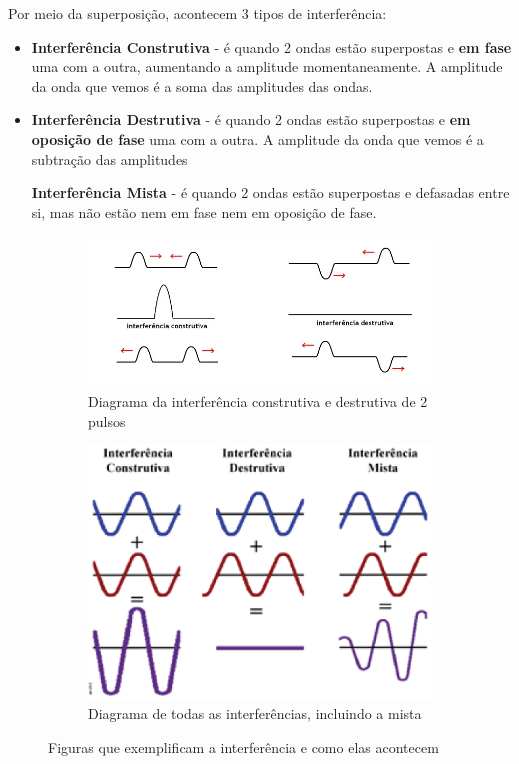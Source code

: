 \documentclass[12pt]{extarticle}
\newcommand{\<}{\langle}
\renewcommand{\>}{\rangle}
\theoremstyle{definition}
\begin{document}
Por meio da superposição, acontecem 3 tipos de interferência:
\begin{itemize}
    \item \textbf{Interferência Construtiva} - é quando 2 ondas estão superpostas e \textbf{em fase} uma com a outra, aumentando a amplitude momentaneamente. A amplitude da onda que vemos é a soma das amplitudes das ondas.
    
    \item \textbf{Interferência Destrutiva} - é quando 2 ondas estão superpostas e \textbf{em oposição de fase} uma com a outra. A amplitude da onda que vemos é a subtração das amplitudes
    
    \textbf{Interferência Mista} - é quando 2 ondas estão superpostas e defasadas entre si, mas não estão nem em fase nem em oposição de fase.
\end{itemize}

\begin{figure}[H]
    \centering
    \begin{subfigure}[b]{0.55\textwidth}
         \centering
         \includegraphics[height=4cm]{interferencia.jpg}
         \caption{Diagrama da interferência construtiva e destrutiva de 2 pulsos}
         \label{fig:interferencia}
     \end{subfigure}
     \hfill
     \begin{subfigure}[b]{0.4\textwidth}
         \centering
         \includegraphics[width=\textwidth]{interferencia_mista.png}
         \caption{Diagrama de todas as interferências, incluindo a mista}
         \label{fig:mista}
     \end{subfigure}
    \caption{Figuras que exemplificam a interferência e como elas acontecem}
    \label{fig:interferencia_geral}
\end{figure}
\end{document}
